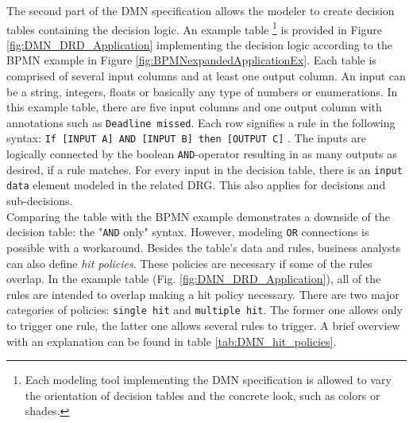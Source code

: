 The second part of the DMN specification allows the modeler to create decision tables containing the decision logic. An example table \footnote{Each modeling tool implementing the DMN specification is allowed to vary the orientation of decision tables and the concrete look, such as colors or shades.} is provided in Figure \ref{fig:DMN_DRD_Application} implementing the decision logic according to the BPMN example in Figure \ref{fig:BPMNexpandedApplicationEx}. Each table is comprised of several input columns and at least one output column. An input can be a string, integers, floats or basically any type of numbers or enumerations. In this example table, there are five input columns and one output column with annotations such as \texttt{Deadline missed}. Each row signifies a rule in the following syntax: \texttt{If [INPUT A] AND [INPUT B] then [OUTPUT C]} \cite{DMNspec2016}. The inputs are logically connected by the boolean \texttt{AND}-operator resulting in as many outputs as desired, if a rule matches. For every input in the decision table, there is an \texttt{input data} element modeled in the related \ac{DRG}. This also applies for decisions and sub-decisions. \\
Comparing the table with the BPMN example demonstrates a downside of the decision table: the "\texttt{AND} only" syntax. However, modeling \texttt{OR} connections is possible with a workaround. Besides the table's data and rules, business analysts can also define \textit{hit policies}. These policies are necessary if some of the rules overlap. In the example table (Fig. \ref{fig:DMN_DRD_Application}), all of the rules are intended to overlap making a hit policy necessary. There are two major categories of policies: \texttt{single hit} and \texttt{multiple hit}. The former one allows only to trigger one rule, the latter one allows several rules to trigger. A brief overview with an explanation can be found in table \ref{tab:DMN_hit_policies}. 

